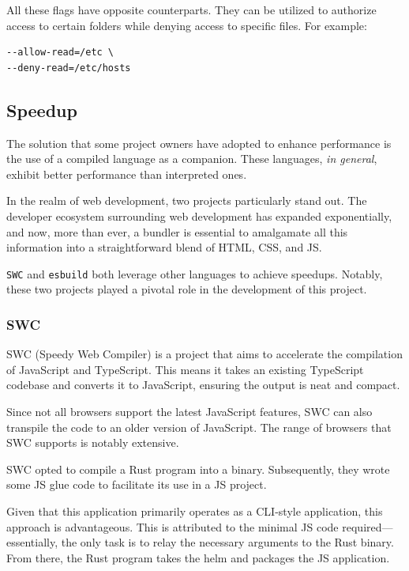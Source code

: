 \documentclass[10pt,journal,compsoc]{IEEEtran}
\begin{document}
All these flags have opposite counterparts. They can be utilized to authorize access to certain folders while denying access to specific files. For example:

\begin{lstlisting}
--allow-read=/etc \
--deny-read=/etc/hosts
\end{lstlisting}

\subsection{Speedup}

The solution that some project owners have adopted to enhance performance is the use of a compiled language as a companion. These languages, \textit{in general}, exhibit better performance than interpreted ones.

In the realm of web development, two projects particularly stand out. The developer ecosystem surrounding web development has expanded exponentially, and now, more than ever, a bundler \cite{Bundler} is essential to amalgamate all this information into a straightforward blend of HTML, CSS, and JS.

\verb|SWC| and \verb|esbuild| both leverage other languages to achieve speedups. Notably, these two projects played a pivotal role in the development of this project.

\subsubsection{SWC}

SWC (Speedy Web Compiler) is a project that aims to accelerate the compilation of JavaScript and TypeScript. This means it takes an existing TypeScript codebase and converts it to JavaScript, ensuring the output is neat and compact.

Since not all browsers support the latest JavaScript features, SWC can also transpile the code to an older version of JavaScript. The range of browsers that SWC supports is notably extensive.

SWC opted to compile a Rust program into a binary. Subsequently, they wrote some JS glue code to facilitate its use in a JS project.

Given that this application primarily operates as a CLI-style application, this approach is advantageous. This is attributed to the minimal JS code required—essentially, the only task is to relay the necessary arguments to the Rust binary. From there, the Rust program takes the helm and packages the JS application.
\end{document}
